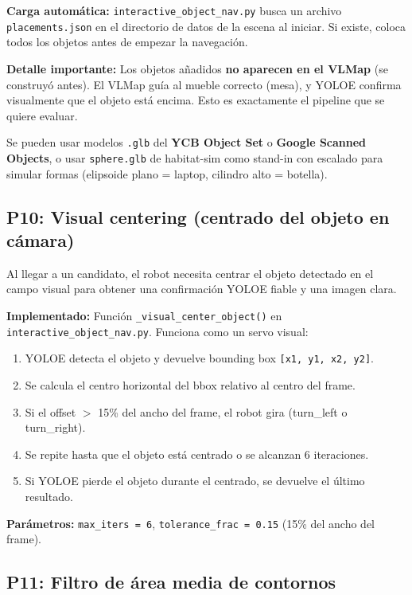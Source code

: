 \documentclass[11pt,a4paper]{article}
\begin{document}
\textbf{Carga automática:} \texttt{interactive\_object\_nav.py} busca un archivo \texttt{placements.json} en el directorio de datos de la escena al iniciar. Si existe, coloca todos los objetos antes de empezar la navegación.

\textbf{Detalle importante:} Los objetos añadidos \textbf{no aparecen en el VLMap} (se construyó antes). El VLMap guía al mueble correcto (mesa), y YOLOE confirma visualmente que el objeto está encima. Esto es exactamente el pipeline que se quiere evaluar.

Se pueden usar modelos \texttt{.glb} del \textbf{YCB Object Set} o \textbf{Google Scanned Objects}, o usar \texttt{sphere.glb} de habitat-sim como stand-in con escalado para simular formas (elipsoide plano = laptop, cilindro alto = botella).

\subsection{P10: Visual centering (centrado del objeto en cámara)}

Al llegar a un candidato, el robot necesita centrar el objeto detectado en el campo visual para obtener una confirmación YOLOE fiable y una imagen clara.

\textbf{Implementado:} Función \texttt{\_visual\_center\_object()} en \texttt{interactive\_object\_nav.py}. Funciona como un servo visual:
\begin{enumerate}
    \item YOLOE detecta el objeto y devuelve bounding box \texttt{[x1, y1, x2, y2]}.
    \item Se calcula el centro horizontal del bbox relativo al centro del frame.
    \item Si el offset $>$ 15\% del ancho del frame, el robot gira (turn\_left o turn\_right).
    \item Se repite hasta que el objeto está centrado o se alcanzan 6 iteraciones.
    \item Si YOLOE pierde el objeto durante el centrado, se devuelve el último resultado.
\end{enumerate}

\textbf{Parámetros:} \texttt{max\_iters = 6}, \texttt{tolerance\_frac = 0.15} (15\% del ancho del frame).

\subsection{P11: Filtro de área media de contornos}
\end{document}
